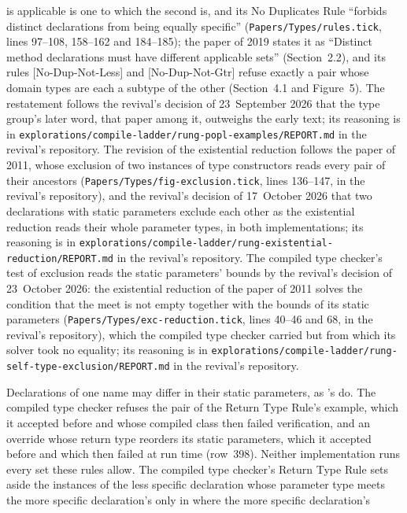 \begin{description}
is applicable is one to which the second is, and its No Duplicates Rule
``forbids distinct declarations from being equally specific''
(\nolinkurl{Papers/Types/rules.tick}, lines 97--108, 158--162 and 184--185);
the paper of 2019 states it as ``Distinct method declarations must have
different applicable sets'' (Section~2.2), and its rules [No-Dup-Not-Less] and
[No-Dup-Not-Gtr] refuse exactly a pair whose domain types are each a subtype of
the other (Section~4.1 and Figure~5).
The restatement follows the revival's decision of 23~September 2026 that the
type group's later word, that paper among it, outweighs the early text; its
reasoning is in
\nolinkurl{explorations/compile-ladder/rung-popl-examples/REPORT.md} in the
revival's repository.
The revision of the existential reduction follows the paper of 2011, whose
exclusion of two instances of type constructors reads every pair of their
ancestors (\nolinkurl{Papers/Types/fig-exclusion.tick}, lines 136--147, in the
revival's repository), and the revival's decision of 17~October 2026 that two
declarations with static parameters exclude each other as the existential
reduction reads their whole parameter types, in both implementations; its
reasoning is in
\nolinkurl{explorations/compile-ladder/rung-existential-reduction/REPORT.md} in
the revival's repository.
The compiled type checker's test of exclusion reads the static parameters'
bounds by the revival's decision of 23~October 2026: the existential reduction of
the paper of 2011 solves the condition that the meet is not empty together with
the bounds of its static parameters (\nolinkurl{Papers/Types/exc-reduction.tick},
lines 40--46 and 68, in the revival's repository), which the compiled type
checker carried but from which its solver took no equality; its reasoning is in
\nolinkurl{explorations/compile-ladder/rung-self-type-exclusion/REPORT.md} in the
revival's repository.
\item[Effect] Declarations of one name may differ in their static parameters,
as \library's do.
The compiled type checker refuses the pair of the Return Type Rule's example,
which it accepted before and whose compiled class then failed verification, and
an override whose return type reorders its static parameters, which it accepted
before and which then failed at run time (row~398).
Neither implementation runs every set these rules allow.
The compiled type checker's Return Type Rule sets aside the instances of the
less specific declaration whose parameter type meets the more specific
declaration's only in  where the more specific declaration's

\end{description}
